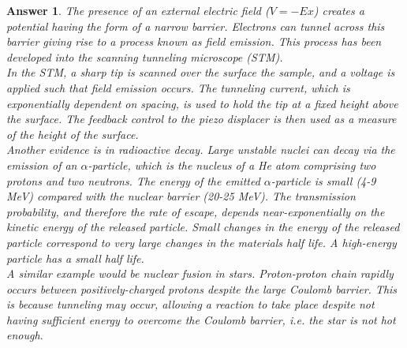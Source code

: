 \documentclass[a4paper]{article}
\newtheorem{ans}{Answer}[subsection]
\theoremstyle{new}
\begin{document}
\begin{ans}
The presence of an external electric field ($V =-Ex$) creates a potential having the form of a narrow barrier. Electrons can tunnel across this barrier giving rise to a process known as field emission. This process has been developed into the scanning tunneling microscope (STM).\\[5pt]
In the STM, a sharp tip is scanned over the surface the sample, and a voltage is applied such that field emission occurs. The tunneling current, which is exponentially dependent on spacing, is used to hold the tip at a fixed height above the surface. The feedback control to the piezo displacer is then used as a measure of the height of the surface.\\[5pt]
Another evidence is in radioactive decay. Large unstable nuclei can decay via the emission of an $\alpha$-particle, which is the nucleus of a He atom comprising two protons and two neutrons. The energy of the emitted $\alpha$-particle is small (4-9 MeV) compared with the nuclear barrier (20-25 MeV). The transmission probability, and therefore the rate of escape, depends near-exponentially on the kinetic energy of the released particle. Small changes in the energy of the released particle correspond to very large changes in the materials half life. A high-energy particle has a small half life.\\[5pt]
A similar example would be nuclear fusion in stars. Proton-proton chain rapidly occurs between positively-charged protons despite the large Coulomb barrier. This is because tunneling may occur, allowing a reaction to take place despite not having sufficient energy to overcome the Coulomb barrier, i.e. the star is not hot enough.
\end{ans}
\newpage
\end{document}
